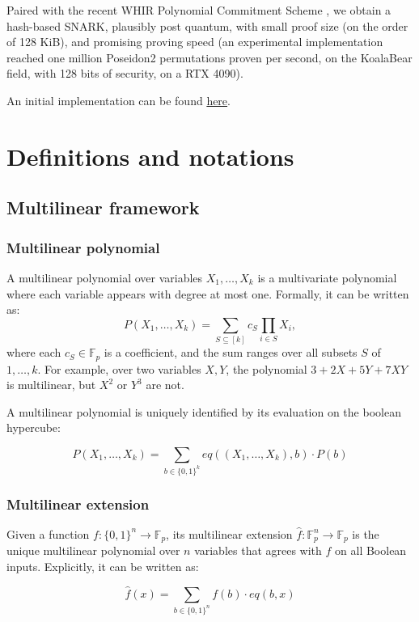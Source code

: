 \documentclass{article}
\newcommand{\Fp}{\mathbb F_p}
\begin{document}
Paired with the recent WHIR Polynomial Commitment Scheme \cite{whir}, we obtain a hash-based SNARK, plausibly post quantum, with small proof size (on the order of 128 KiB), and promising proving speed (an experimental implementation reached one million Poseidon2 permutations proven per second, on the KoalaBear field, with 128 bits of security, on a RTX 4090).

An initial implementation can be found \href{https://github.com/TomWambsgans/Whirlaway}{here}.

\section{Definitions and notations}

\subsection{Multilinear framework}

\subsubsection{Multilinear polynomial}

A multilinear polynomial over variables $X_1, \dots, X_k$ is a multivariate polynomial where each variable appears with degree at most one. Formally, it can be written as:
$$
    P(X_1, \dots, X_k) = \sum_{S \subseteq [k]} c_S \prod_{i \in S} X_i,
$$
where each $c_S \in \Fp$ is a coefficient, and the sum ranges over all subsets $S$ of ${1, \dots, k}$. For example, over two variables $X, Y$, the polynomial $3 + 2X + 5Y + 7XY$ is multilinear, but $X^2$ or $Y^3$ are not.

A multilinear polynomial is uniquely identified by its evaluation on the boolean hypercube:

$$
    P(X_1, \dots, X_k) = \sum_{b \in \{0, 1\}^k} eq((X_1, \dots, X_k), b) \cdot P(b)
$$


\subsubsection{Multilinear extension}



Given a function $f: \{0,1\}^n \to \Fp$, its multilinear extension $\widehat{f}: \Fp^n \to \Fp$ is the unique multilinear polynomial over $n$ variables that agrees with $f$ on all Boolean inputs. Explicitly, it can be written as:

$$
\widehat{f}(x) = \sum_{b \in \{0,1\}^n} f(b) \cdot eq(b, x)
$$
\end{document}
